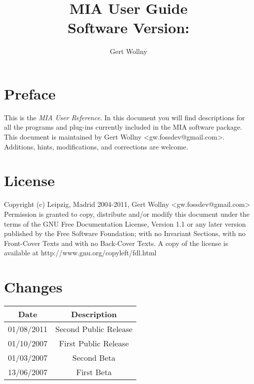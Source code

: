\documentclass[english, 10pt, a4paper,headsepline,openany]{scrbook}
\begin{document}
\vfill{}
\title{MIA User Guide \\Software Version: \miaversion}
\vfill{}


\author{Gert Wollny}

\maketitle

\section*{Preface}

This is the \emph{MIA User Reference}. 
In this document you will find descriptions for all the programs and plug-ins currently included in the 
  MIA software package. 
This document is maintained by Gert Wollny <gw.fossdev@gmail.com>. 
Additions, hints, modifications, and corrections are welcome. 

\section*{License}

Copyright (c) Leipzig, Madrid 2004-2011, Gert Wollny <gw.fossdev@gmail.com>
Permission is granted to copy, distribute and/or modify this document under the terms of the 
  GNU Free Documentation License, Version 1.1 or any later version published by the 
  Free Software Foundation; with no Invariant Sections, 
  with no Front-Cover Texts and with no Back-Cover Texts. 
A copy of the license is available at http://www.gnu.org/copyleft/fdl.html

\section*{Changes}

\begin{center}
\begin{tabular}{cc}
\hline 
Date  & Description\\
\hline
\hline 
01/08/2011 & Second Public Release  \\
01/10/2007 & First Public Release  \\
01/03/2007 & Second Beta \\
13/06/2007 & First Beta  \\
\hline
\end{tabular}
\end{center}

\tableofcontents{}
\end{document}
